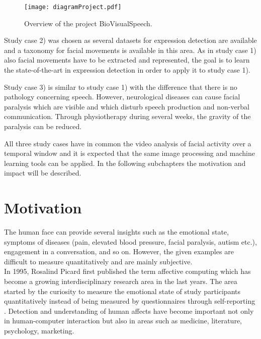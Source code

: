 \begin{figure}
    \centering
    \texttt{[image: diagramProject.pdf]}
    \caption{Overview of the project BioVisualSpeech.}
    \label{fig:project}
\end{figure}

Study case 2) was chosen as several datasets for expression detection are available and a taxonomy for facial movements is available in this area. As in study case 1) also facial movements have to be extracted and represented, the goal is to learn the state-of-the-art in expression detection in order to apply it to study case 1).

Study case 3) is similar to study case 1) with the difference that there is no pathology concerning speech. However, neurological diseases can cause facial paralysis which are visible and which disturb speech production and non-verbal communication. Through physiotherapy during several weeks, the gravity of the paralysis can be reduced. 

All three study cases have in common the video analysis of facial activity over a temporal window and it is expected that the same image processing and machine learning tools can be applied. In the following subchapters the motivation and impact will be described.  




\section{Motivation} %
\label{sec:motivation}

The human face can provide several insights such as the emotional state, symptoms of diseases (pain, elevated blood pressure, facial paralysis, autism etc.), engagement in a conversation, and so on. However, the given examples are difficult to measure quantitatively and are mainly subjective.\\

In 1995, Rosalind Picard first published the term affective computing which has become a growing interdisciplinary research area in the last years. The area started by the curiosity to measure the emotional state of study participants quantitatively instead of being measured by questionnaires through self-reporting \cite{Picard2014promise}. Detection and understanding of human affects have become important not only in human-computer interaction but also in areas such as medicine, literature, psychology, marketing.
 
